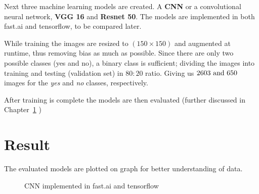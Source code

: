 \documentclass[10pt]{report}
\begin{document}
	Next three machine learning models are created. A \textbf{CNN} or a
	convolutional neural network, \textbf{VGG 16} and \textbf{Resnet 50}. The
	models are implemented in both fast.ai and tensorflow, to be compared later.

	While training the images are resized to $(150 \times 150)$ and augmented at
	runtime, thus removing bias as much as possible. Since there are only two
	possible classes (yes and no), a binary class is sufficient; dividing the
	images into training and testing (validation set) in $80:20$ ratio. Giving
	us $2603 \ \textnormal{and} \ 650$ images for the \textit{yes} and
	\textit{no} classes, respectively.

	After training is complete the models are then evaluated (further discussed
	in Chapter~\ref{chap:Res} )

	\chapter{Result}
	\label{chap:Res}

	The evaluated models are plotted on graph for better understanding of data.

	\begin{figure}[H]
		\centering
		\hspace{0.5cm}
		\caption{CNN implemented in fast.ai and tensorflow}
		\label{CNN in fast.ai and tensorflow}
	\end{figure}
\end{document}

